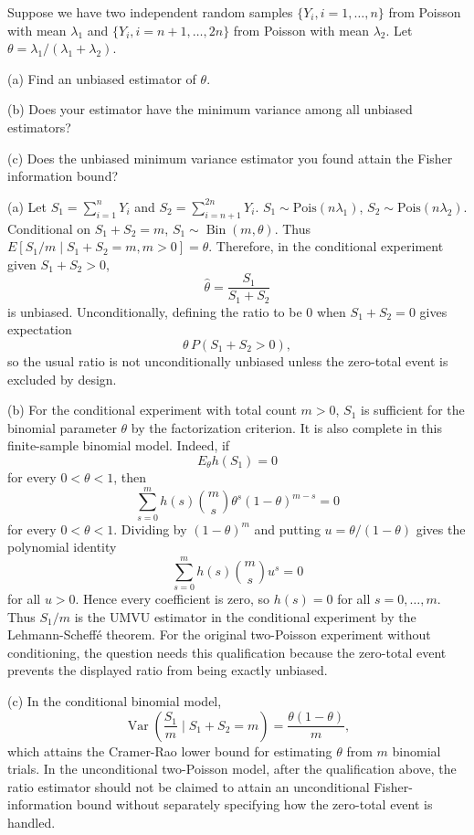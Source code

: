 \begin{exercise}
\label{applied:2011:12}
Suppose we have two independent random samples $\{Y_i, i = 1 , \ldots , n \}$ from Poisson with mean $\lambda _ { 1 }$ and $\{ Y _ { i } , i = n + 1 , \dots , 2 n \}$ from Poisson with mean $\lambda _ { 2 }$. Let $\theta = \lambda _ { 1 } / ( \lambda _ { 1 } + \lambda _ { 2 } )$.

(a) Find an unbiased estimator of $\theta$.

(b) Does your estimator have the minimum variance among all unbiased estimators?

(c) Does the unbiased minimum variance estimator you found attain the Fisher information bound?
\end{exercise}

\begin{solution}
(a) Let $S_1 = \sum_{i=1}^n Y_i$ and $S_2 = \sum_{i=n+1}^{2n} Y_i$. $S_1 \sim \text{Pois}(n\lambda_1)$, $S_2 \sim \text{Pois}(n\lambda_2)$.
Conditional on $S_1 + S_2 = m$, $S_1 \sim \operatorname{Bin}(m, \theta)$.
Thus $E[S_1 / m \mid S_1+S_2=m, m>0] = \theta$.
Therefore, in the conditional experiment given $S_1+S_2>0$,
\[
\hat{\theta}=\frac{S_1}{S_1+S_2}
\]
is unbiased.  Unconditionally, defining the ratio to be $0$ when $S_1+S_2=0$ gives expectation
\[
\theta\,P(S_1+S_2>0),
\]
so the usual ratio is not unconditionally unbiased unless the zero-total event is excluded by design.

(b) For the conditional experiment with total count $m>0$, $S_1$ is sufficient for the binomial parameter $\theta$ by the factorization criterion.  It is also complete in this finite-sample binomial model.  Indeed, if
\[
E_\theta h(S_1)=0
\]
for every $0<\theta<1$, then
\[
\sum_{s=0}^m h(s){m\choose s}\theta^s(1-\theta)^{m-s}=0
\]
for every $0<\theta<1$.  Dividing by $(1-\theta)^m$ and putting $u=\theta/(1-\theta)$ gives the polynomial identity
\[
\sum_{s=0}^m h(s){m\choose s}u^s=0
\]
for all $u>0$.  Hence every coefficient is zero, so $h(s)=0$ for all $s=0,\ldots,m$.  Thus $S_1/m$ is the UMVU estimator in the conditional experiment by the Lehmann-Scheffé theorem.  For the original two-Poisson experiment without conditioning, the question needs this qualification because the zero-total event prevents the displayed ratio from being exactly unbiased.

(c) In the conditional binomial model,
\[
\operatorname{Var}\left(\frac{S_1}{m}\mid S_1+S_2=m\right)=\frac{\theta(1-\theta)}{m},
\]
which attains the Cramer-Rao lower bound for estimating $\theta$ from $m$ binomial trials.  In the unconditional two-Poisson model, after the qualification above, the ratio estimator should not be claimed to attain an unconditional Fisher-information bound without separately specifying how the zero-total event is handled.
\end{solution}
